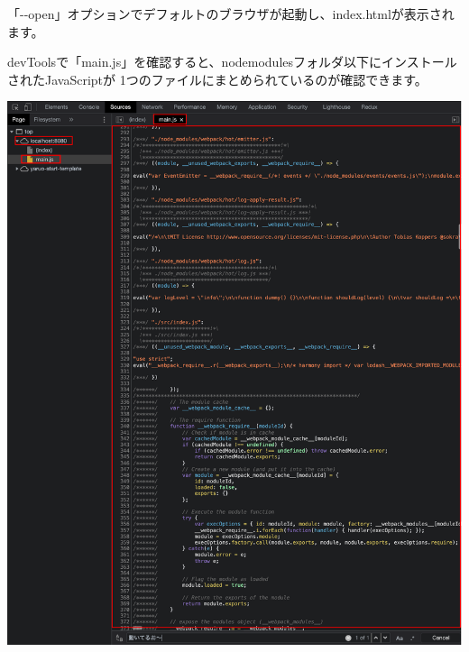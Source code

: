 \clearpage


「{-}{-}open」オプションでデフォルトのブラウザが起動し、index.htmlが表示されます。

\begin{reviewimage}%
%
\label{image:02-create-react-app:webpack_test01}
\end{reviewimage}

\clearpage


devToolsで「main.js」を確認すると、node\textunderscore{}modulesフォルダ以下にインストールされたJavaScriptが
1つのファイルにまとめられているのが確認できます。

\begin{reviewimage}%
\includegraphics[width=0.8\maxwidth]{./images/02-create-react-app/webpack_test02.png}%
\label{image:02-create-react-app:webpack_test02}
\end{reviewimage}

